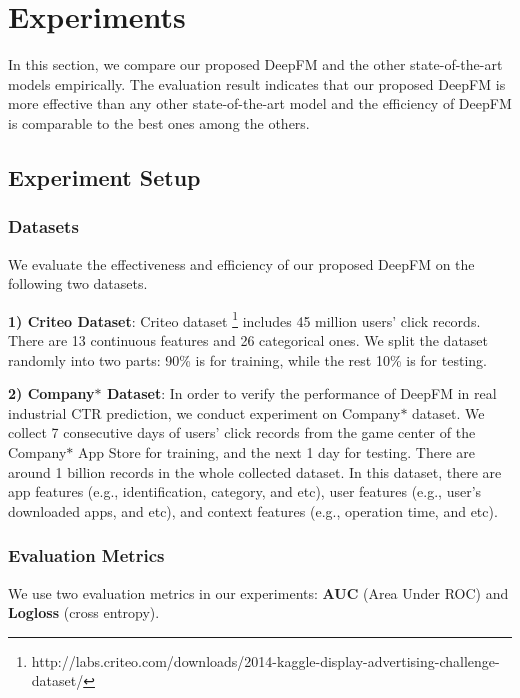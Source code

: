 
\section{Experiments}\label{section:exp}

In this section, we compare our proposed DeepFM and the other state-of-the-art models empirically. The evaluation result indicates that our proposed DeepFM is more effective than any other state-of-the-art model and the efficiency of DeepFM is comparable to the best ones among the others.

\subsection{Experiment Setup}\label{sec:exp:set}

\subsubsection{Datasets}\label{sec:exp:set:data}

We evaluate the effectiveness and efficiency of our proposed DeepFM on the following two datasets.

\noindent\textbf{1) Criteo Dataset}: Criteo dataset \footnote{http://labs.criteo.com/downloads/2014-kaggle-display-advertising-challenge-dataset/} includes 45 million users' click records. There are 13 continuous features and 26 categorical ones. We split the dataset randomly into two parts: 90\% is for training, while the rest 10\% is for testing.

\noindent\textbf{2) Company$\ast$ Dataset}: In order to verify the performance of DeepFM in real industrial CTR prediction, we conduct experiment on Company$\ast$ dataset. We collect 7 consecutive days of users' click records from the game center of the Company$\ast$ App Store for training, and the next 1 day for testing. There are around 1 billion records in the whole collected dataset. In this dataset, there are app features (e.g., identification, category, and etc), user features (e.g., user's downloaded apps, and etc), and context features (e.g., operation time, and etc).

\subsubsection{Evaluation Metrics}\label{sec:exp:set:metric}

We use two evaluation metrics in our experiments: \textbf{AUC} (Area Under ROC) and \textbf{Logloss} (cross entropy).

